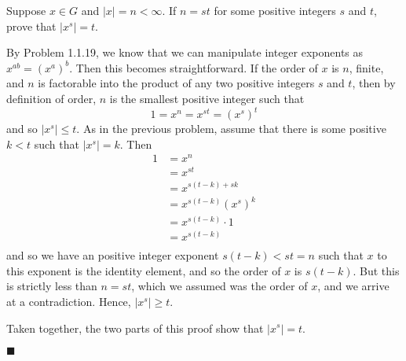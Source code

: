 \documentclass[12pt]{article}
\renewcommand{\qed}{\hfill$\blacksquare$}
\renewenvironment{proof}{\begin{addmargin}[1em]{0em}\begin{newproof}}{\end{newproof}\end{addmargin}\qed}
\newenvironment{problem}[2][Exercise]{\begin{trivlist}
\item[\hskip \labelsep {\bfseries #1}\hskip \labelsep {\bfseries #2.}]}{\end{trivlist}}
\begin{document}
\begin{problem}{1.1.23}
Suppose $x\in G$ and $\left|x\right|=n < \infty$. If $n=st$ for some positive integers $s$ and $t$, prove that $\left|x^s\right|=t$.
\end{problem}
\begin{proof}
By Problem 1.1.19, we know that we can manipulate integer exponents as $x^{ab} = \left(x^a\right)^b$. Then this becomes straightforward. If the order of $x$ is $n$, finite, and $n$ is factorable into the product of any two positive integers $s$ and $t$, then by definition of order, $n$ is the smallest positive integer such that
$$ 1 = x^n = x^{st} = \left(x^s\right)^t $$
and so $\left|x^s\right| \leq t$. As in the previous problem, assume that there is some positive $k<t$ such that $\left|x^s\right|=k$. Then \begin{equation*}
    \begin{split}
        1 & = x^n \\
        & = x^{st} \\
        & = x^{s\left(t-k\right)+sk} \\
        & = x^{s\left(t-k\right)} \left(x^s\right)^{k} \\
        & = x^{s\left(t-k\right)}\cdot 1 \\
        & = x^{s\left(t-k\right)}\\
    \end{split}
\end{equation*}
and so we have an positive integer exponent $s\left(t-k\right) < st = n$ such that $x$ to this exponent is the identity element, and so the order of $x$ is $s\left(t-k\right)$. But this is strictly less than $n=st$, which we assumed was the order of $x$, and we arrive at a contradiction. Hence, $\left|x^s\right| \geq t$.

Taken together, the two parts of this proof show that $\left|x^s\right|=t$.
\end{proof}
\end{document}
